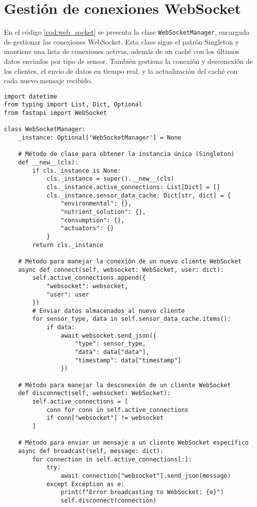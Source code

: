 \section{Gestión de conexiones WebSocket}

En el código \ref{cod:web_socket} se presenta la clase
\texttt{WebSocketManager}, encargada de gestionar las conexiones WebSocket.
Esta clase sigue el patrón Singleton y mantiene una lista de conexiones
activas, además de un caché con los últimos datos enviados por tipo de sensor.
También gestiona la conexión y desconexión de los clientes, el envío de datos
en tiempo real, y la actualización del caché con cada nuevo mensaje recibido.

\begin{lstlisting}[label=cod:web_socket,caption=Definición de clase WebSocket. , language=PythonUTF8]
import datetime
from typing import List, Dict, Optional
from fastapi import WebSocket 
    
class WebSocketManager:
    _instance: Optional['WebSocketManager'] = None
        
    # Método de clase para obtener la instancia única (Singleton)
    def __new__(cls):
        if cls._instance is None:
            cls._instance = super().__new__(cls)
            cls._instance.active_connections: List[Dict] = []
            cls._instance.sensor_data_cache: Dict[str, dict] = {
                "environmental": {},
                "nutrient_solution": {},
                "consumption": {},
                "actuators": {}
            }
        return cls._instance
        
    # Método para manejar la conexión de un nuevo cliente WebSocket
    async def connect(self, websocket: WebSocket, user: dict):
        self.active_connections.append({
            "websocket": websocket,
            "user": user
        })
        # Enviar datos almacenados al nuevo cliente
        for sensor_type, data in self.sensor_data_cache.items():
            if data:
                await websocket.send_json({
                    "type": sensor_type,
                    "data": data["data"],
                    "timestamp": data["timestamp"]
                })
        
    # Método para manejar la desconexión de un cliente WebSocket
    def disconnect(self, websocket: WebSocket):
        self.active_connections = [
            conn for conn in self.active_connections 
            if conn["websocket"] != websocket
        ]
        
    # Método para enviar un mensaje a un cliente WebSocket específico
    async def broadcast(self, message: dict):
        for connection in self.active_connections[:]:
            try:
                await connection["websocket"].send_json(message)
            except Exception as e:
                print(f"Error broadcasting to WebSocket: {e}")
                self.disconnect(connection)
        

\end{lstlisting}
